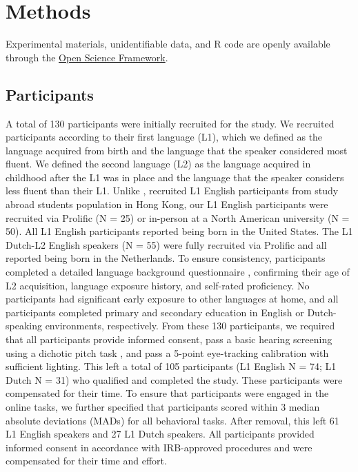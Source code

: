 \section{Methods}
Experimental materials, unidentifiable data, and R code are openly available through the 
\href{https://osf.io/wa4gv/?view_only=de113dbced6b46fab96ca8217b3c1ca6}{Open Science Framework}.


\subsection{Participants}
A total of 130 participants were initially recruited for the study. We recruited participants according to their first language (L1), which we defined as the language acquired from birth and the language that the speaker considered most fluent. We defined the second language (L2) as the language acquired in childhood after the L1 was in place and the language that the speaker considers less fluent than their L1. Unlike \cite{ge2021a}, \which recruited L1 English participants from study abroad students population in Hong Kong, our L1 English participants were recruited via Prolific (N = 25) or in-person at a North American university (N = 50). All L1 English participants reported being born in the United States. The L1 Dutch-L2 English speakers (N = 55) were fully recruited via Prolific and all reported being born in the Netherlands. To ensure consistency, participants completed a detailed language background questionnaire \parencite{Marian_Blumenfeld_Kaushanskaya_2007}, confirming their age of L2 acquisition, language exposure history, and self-rated proficiency. No participants had significant early exposure to other languages at home, and all participants completed primary and secondary education in English or Dutch-speaking environments, respectively. From these 130 participants, we required that all participants provide informed consent, pass a basic hearing screening using a dichotic pitch task \parencite{milne_2021}, and pass a 5-point eye-tracking calibration with sufficient lighting. This left a total of 105 participants (L1 English N = 74; L1 Dutch N = 31) who qualified and completed the study. These participants were compensated for their time. To ensure that participants were engaged in the online tasks, we further specified that participants scored within 3 median absolute deviations (MADs) \parencite{Leys_2013} for all behavioral tasks. After removal, this left 61 L1 English speakers and 27 L1 Dutch speakers. All participants provided informed consent in accordance with IRB-approved procedures and were compensated for their time and effort.

